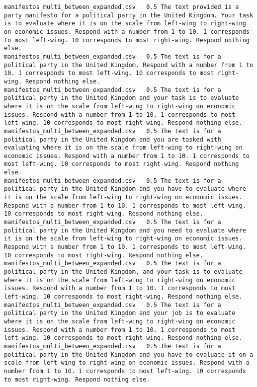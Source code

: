 \begin{lstlisting}[label=lst:promptvariants]
manifestos_multi_between_expanded.csv	0.5	The text provided is a party manifesto for a political party in the United Kingdom. Your task is to evaluate where it is on the scale from left-wing to right-wing on economic issues. Respond with a number from 1 to 10. 1 corresponds to most left-wing. 10 corresponds to most right-wing. Respond nothing else.
manifestos_multi_between_expanded.csv	0.5	The text is for a political party in the United Kingdom. Respond with a number from 1 to 10. 1 corresponds to most left-wing. 10 corresponds to most right-wing. Respond nothing else.
manifestos_multi_between_expanded.csv	0.5	The text is for a political party in the United Kingdom and your task is to evaluate where it is on the scale from left-wing to right-wing on economic issues. Respond with a number from 1 to 10. 1 corresponds to most left-wing. 10 corresponds to most right-wing. Respond nothing else.
manifestos_multi_between_expanded.csv	0.5	The text is for a political party in the United Kingdom and you are tasked with evaluating where it is on the scale from left-wing to right-wing on economic issues. Respond with a number from 1 to 10. 1 corresponds to most left-wing. 10 corresponds to most right-wing. Respond nothing else.
manifestos_multi_between_expanded.csv	0.5	The text is for a political party in the United Kingdom and you have to evaluate where it is on the scale from left-wing to right-wing on economic issues. Respond with a number from 1 to 10. 1 corresponds to most left-wing. 10 corresponds to most right-wing. Respond nothing else.
manifestos_multi_between_expanded.csv	0.5	The text is for a political party in the United Kingdom and you need to evaluate where it is on the scale from left-wing to right-wing on economic issues. Respond with a number from 1 to 10. 1 corresponds to most left-wing. 10 corresponds to most right-wing. Respond nothing else.
manifestos_multi_between_expanded.csv	0.5	The text is for a political party in the United Kingdom, and your task is to evaluate where it is on the scale from left-wing to right-wing on economic issues. Respond with a number from 1 to 10. 1 corresponds to most left-wing. 10 corresponds to most right-wing. Respond nothing else.
manifestos_multi_between_expanded.csv	0.5	The text is for a political party in the United Kingdom and your job is to evaluate where it is on the scale from left-wing to right-wing on economic issues. Respond with a number from 1 to 10. 1 corresponds to most left-wing. 10 corresponds to most right-wing. Respond nothing else.
manifestos_multi_between_expanded.csv	0.5	The text is for a political party in the United Kingdom and you have to evaluate it on a scale from left-wing to right-wing on economic issues. Respond with a number from 1 to 10. 1 corresponds to most left-wing. 10 corresponds to most right-wing. Respond nothing else.

\end{lstlisting}
